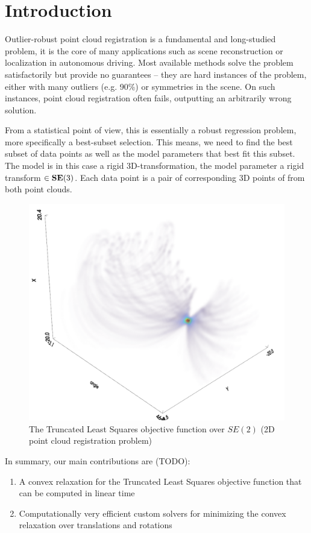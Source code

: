 \section{Introduction}
\label{sec:intro}

Outlier-robust point cloud registration is a fundamental and long-studied problem, it is the core of many applications such as scene reconstruction or localization in autonomous driving. Most available methods solve the problem satisfactorily but provide no guarantees -- they are hard instances of the problem, either with many outliers (e.g. 90\%) or symmetries in the scene. On such instances, point cloud registration often fails, outputting an arbitrarily wrong solution.

From a statistical point of view, this is essentially a robust regression problem, more specifically a best-subset selection. This means, we need to find the best subset of data points as well as the model parameters that best fit this subset.
The model is in this case a rigid 3D-transformation, the model parameter a rigid transform $\in \mathbf{SE(\textrm{3})}$. Each data point is a pair of corresponding 3D points of from both point clouds.

\begin{figure}[!ht]
	\centering
	\begin{adjustbox}{width=1.\linewidth}
		\includegraphics{figures/tls_objective_se2.png}
	\end{adjustbox}
	\caption{The Truncated Least Squares objective function over $SE(2)$ (2D point cloud registration problem)}
	\label{fig:tls-objective}
\end{figure}

In summary, our main contributions are (TODO): 
\begin{enumerate}
	\item A convex relaxation for the Truncated Least Squares objective function that can be computed in linear time
	\item Computationally very efficient custom solvers for minimizing the convex relaxation over translations and rotations
\end{enumerate}






